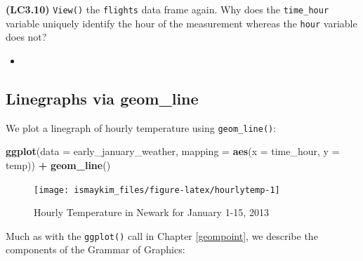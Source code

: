 \documentclass[12pt,]{krantz}
\makeatletter
\newenvironment{Shaded}{\begin{snugshade}}{\end{snugshade}}
\newcommand{\KeywordTok}[1]{\textcolor[rgb]{0.27,0.27,0.27}{\textbf{#1}}}
\newcommand{\DataTypeTok}[1]{\textcolor[rgb]{0.27,0.27,0.27}{#1}}
\newcommand{\StringTok}[1]{\textcolor[rgb]{0.5,0.5,0.5}{#1}}
\newcommand{\OperatorTok}[1]{\textcolor[rgb]{0.43,0.43,0.43}{\textbf{#1}}}
\newcommand{\NormalTok}[1]{#1}
\newenvironment{kframe}{%
\medskip{}
\setlength{\fboxsep}{.8em}
 \def\at@end@of@kframe{}%
 \ifinner\ifhmode%
  \def\at@end@of@kframe{\end{minipage}}%
  \begin{minipage}{\columnwidth}%
 \fi\fi%
 \def\FrameCommand##1{\hskip\@totalleftmargin \hskip-\fboxsep
 \colorbox{shadecolor}{##1}\hskip-\fboxsep
     \hskip-\linewidth \hskip-\@totalleftmargin \hskip\columnwidth}%
 \MakeFramed {\advance\hsize-\width
   \@totalleftmargin\z@ \linewidth\hsize
   \@setminipage}}%
 {\par\unskip\endMakeFramed%
 \at@end@of@kframe}
\renewenvironment{Shaded}{\begin{kframe}}{\end{kframe}}
\newenvironment{rmdblock}[1]
  {\begin{shaded*}
  \begin{itemize}
  \renewcommand{\labelitemi}{
    \raisebox{-.7\height}[0pt][0pt]{
    }
  }
  \item
  }
  {
  \end{itemize}
  \end{shaded*}
  }
\newenvironment{learncheck}
  {\begin{rmdblock}{warning}}
  {\end{rmdblock}}
\theoremstyle{definition}
\theoremstyle{definition}
\theoremstyle{definition}
\theoremstyle{remark}
\makeatother
\begin{document}
\textbf{(LC3.10)} \texttt{View()} the \texttt{flights} data frame again.
Why does the \texttt{time\_hour} variable uniquely identify the hour of
the measurement whereas the \texttt{hour} variable does not?

\begin{learncheck}

\end{learncheck}

\subsection{Linegraphs via geom\_line}\label{geomline}

We plot a linegraph of hourly temperature using \texttt{geom\_line()}:

\begin{Shaded}
\begin{Highlighting}[]
\KeywordTok{ggplot}\NormalTok{(}\DataTypeTok{data =}\NormalTok{ early_january_weather, }
       \DataTypeTok{mapping =} \KeywordTok{aes}\NormalTok{(}\DataTypeTok{x =}\NormalTok{ time_hour, }\DataTypeTok{y =}\NormalTok{ temp)) }\OperatorTok{+}
\StringTok{  }\KeywordTok{geom_line}\NormalTok{()}
\end{Highlighting}
\end{Shaded}

\begin{figure}

{\centering \texttt{[image: ismaykim\_files/figure-latex/hourlytemp-1]} 

}

\caption{Hourly Temperature in Newark for January 1-15, 2013}\label{fig:hourlytemp}
\end{figure}

Much as with the \texttt{ggplot()} call in Chapter \ref{geompoint}, we
describe the components of the Grammar of Graphics:
\end{document}
